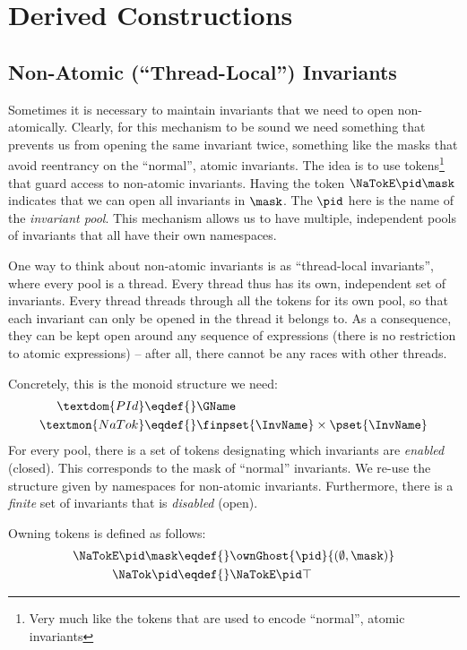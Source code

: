 \section{Derived Constructions}

\subsection{Non-Atomic (``Thread-Local'') Invariants}

Sometimes it is necessary to maintain invariants that we need to open non-atomically.
Clearly, for this mechanism to be sound we need something that prevents us from opening the same invariant twice, something like the masks that avoid reentrancy on the ``normal'', atomic invariants.
The idea is to use tokens\footnote{Very much like the tokens that are used to encode ``normal'', atomic invariants} that guard access to non-atomic invariants.
Having the token $\NaTokE\pid\mask$ indicates that we can open all invariants in $\mask$.
The $\pid$ here is the name of the \emph{invariant pool}.
This mechanism allows us to have multiple, independent pools of invariants that all have their own namespaces.

One way to think about non-atomic invariants is as ``thread-local invariants'',
where every pool is a thread.
Every thread thus has its own, independent set of invariants.
Every thread threads through all the tokens for its own pool, so that each invariant can only be opened in the thread it belongs to.
As a consequence, they can be kept open around any sequence of expressions (\ie there is no restriction to atomic expressions) -- after all, there cannot be any races with other threads.

Concretely, this is the monoid structure we need:
\begin{align*}
\textdom{PId} \eqdef{}& \GName \\
\textmon{NaTok} \eqdef{}& \finpset{\InvName} \times \pset{\InvName}
\end{align*}
For every pool, there is a set of tokens designating which invariants are \emph{enabled} (closed).
This corresponds to the mask of ``normal'' invariants.
We re-use the structure given by namespaces for non-atomic invariants.
Furthermore, there is a \emph{finite} set of invariants that is \emph{disabled} (open).

Owning tokens is defined as follows:
\begin{align*}
\NaTokE\pid\mask \eqdef{}& \ownGhost{\pid}{ (\emptyset, \mask) } \\
\NaTok\pid \eqdef{}& \NaTokE\pid\top
\end{align*}

